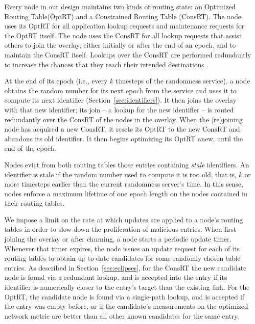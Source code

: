\documentclass[10pt,twocolumn]{article}
\newcommand{\PRT}{OptRT\xspace}
\newcommand{\fullPRT}{Optimized Routing Table\xspace}
\newcommand{\CRT}{ConsRT\xspace}
\newcommand{\fullCRT}{Constrained Routing Table\xspace}
\begin{document}
\label{sec:churn}

Every node in our design maintains 
two kinds of routing state: an \fullPRT (\PRT) and a \fullCRT
(\CRT). The node uses its \PRT for all application lookup requests and
maintenance requests for the \PRT itself.  The node uses
the \CRT for all lookup requests that assist others to join the overlay,
either initially or after the end of an epoch, and to maintain the \CRT
itself. Lookups over the \CRT are performed redundantly to increase the chances that they
reach their intended destinations .

At the end of its epoch (i.e., every $k$ timesteps of the randomness
service), a node obtains the random number for its next epoch from the
service and uses it to compute its next identifier (Section~\ref{sec:identifiers}).  It then joins the overlay with that new
identifier; its join -- a lookup for the new identifier --
is routed redundantly over the \CRT of the nodes in the overlay.  When
the (re)joining node has acquired a new \CRT, 
it resets its \PRT to the new \CRT and abandons its old identifier.
It then begins optimizing its \PRT anew, until the end of the epoch.

Nodes evict from both routing tables those entries containing \emph{stale}
identifiers.  An identifier is stale if the random number used to
compute it is too old, that is,
$k$ or more timesteps earlier than the current randomness server's
time.  In this sense, nodes enforce a maximum lifetime of one epoch
length
on the nodes contained in their routing tables.



\label{sec:rateLimitation}

We impose a limit on the rate at which updates are applied to a node's
routing tables in order to slow down the proliferation of malicious
entries.
When first joining the overlay or after
churning, a node starts a periodic update timer.  Whenever that timer
expires, the node issues an update request for each of its routing
tables to obtain up-to-date candidates for some randomly chosen table
entries.  
As described in Section~\ref{sec:eclipses}, for the \CRT the new candidate
node is found via a redundant lookup, and
is accepted into the entry if its identifier is numerically closer to the
entry's target than the existing link.
For the \PRT, the candidate node is found via a single-path lookup, and is
accepted if the entry was empty before, or if the candidate's
measurements on the
optimized network metric are better than all other known candidates for
the same entry.
\end{document}
